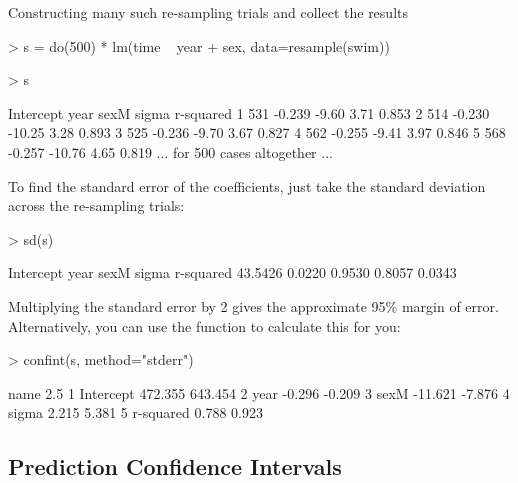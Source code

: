 Constructing many such re-sampling trials and collect the results 
\begin{Schunk}
\begin{Sinput}
> s = do(500) * lm(time ~ year + sex, data=resample(swim))
\end{Sinput}
\end{Schunk}
\begin{Schunk}
\begin{Sinput}
> s
\end{Sinput}
\end{Schunk}
\begin{Schunk}
\begin{Soutput}
  Intercept   year   sexM sigma r-squared
1       531 -0.239  -9.60  3.71     0.853
2       514 -0.230 -10.25  3.28     0.893
3       525 -0.236  -9.70  3.67     0.827
4       562 -0.255  -9.41  3.97     0.846
5       568 -0.257 -10.76  4.65     0.819
... for 500 cases altogether ...
\end{Soutput}
\end{Schunk}

To find the standard error of the coefficients, just take the standard
deviation across the re-sampling trials:
\begin{Schunk}
\begin{Sinput}
> sd(s)
\end{Sinput}
\begin{Soutput}
Intercept      year      sexM     sigma r-squared 
  43.5426    0.0220    0.9530    0.8057    0.0343 
\end{Soutput}
\end{Schunk}

Multiplying the standard error by 2 gives the approximate 95\% margin
of error.  Alternatively, you can use the  function
to calculate this for you:
\begin{Schunk}
\begin{Sinput}
> confint(s, method="stderr")
\end{Sinput}
\begin{Soutput}
       name    2.5%   97.5%
1 Intercept 472.355 643.454
2      year  -0.296  -0.209
3      sexM -11.621  -7.876
4     sigma   2.215   5.381
5 r-squared   0.788   0.923
\end{Soutput}
\end{Schunk}



\subsection{Prediction Confidence Intervals}

